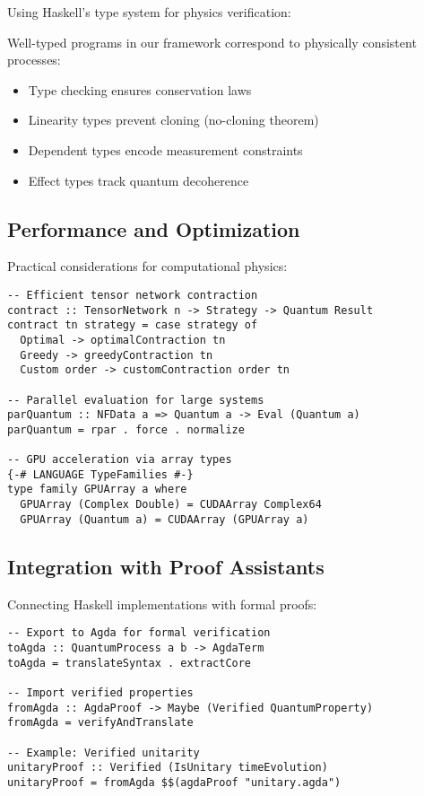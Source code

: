 Using Haskell's type system for physics verification:

\begin{proposition}
Well-typed programs in our framework correspond to physically consistent processes:
\begin{itemize}
\item Type checking ensures conservation laws
\item Linearity types prevent cloning (no-cloning theorem)
\item Dependent types encode measurement constraints
\item Effect types track quantum decoherence
\end{itemize}
\end{proposition}

\subsection{Performance and Optimization}

Practical considerations for computational physics:

\begin{example}
\begin{verbatim}
-- Efficient tensor network contraction
contract :: TensorNetwork n -> Strategy -> Quantum Result
contract tn strategy = case strategy of
  Optimal -> optimalContraction tn
  Greedy -> greedyContraction tn
  Custom order -> customContraction order tn

-- Parallel evaluation for large systems
parQuantum :: NFData a => Quantum a -> Eval (Quantum a)
parQuantum = rpar . force . normalize

-- GPU acceleration via array types
{-# LANGUAGE TypeFamilies #-}
type family GPUArray a where
  GPUArray (Complex Double) = CUDAArray Complex64
  GPUArray (Quantum a) = CUDAArray (GPUArray a)
\end{verbatim}
\end{example}

\subsection{Integration with Proof Assistants}

Connecting Haskell implementations with formal proofs:

\begin{example}
\begin{verbatim}
-- Export to Agda for formal verification
toAgda :: QuantumProcess a b -> AgdaTerm
toAgda = translateSyntax . extractCore

-- Import verified properties
fromAgda :: AgdaProof -> Maybe (Verified QuantumProperty)
fromAgda = verifyAndTranslate

-- Example: Verified unitarity
unitaryProof :: Verified (IsUnitary timeEvolution)
unitaryProof = fromAgda $$(agdaProof "unitary.agda")
\end{verbatim}
\end{example}

